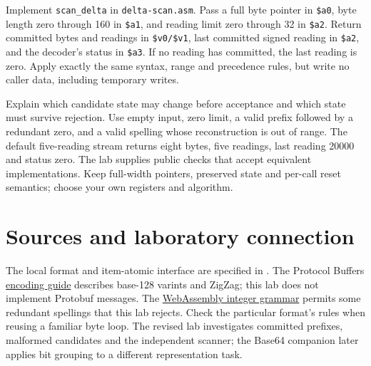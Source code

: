 Implement \texttt{scan\_delta} in \texttt{delta-scan.asm}. Pass a full byte
pointer in \texttt{\$a0}, byte length zero through 160 in \texttt{\$a1}, and
reading limit zero through 32 in \texttt{\$a2}. Return committed bytes and
readings in \texttt{\$v0/\$v1}, last committed signed reading in
\texttt{\$a2}, and the decoder's status in \texttt{\$a3}. If no reading has
committed, the last reading is zero. Apply exactly the same syntax, range and
precedence rules, but write no caller data, including temporary writes.

Explain which candidate state may change before acceptance and which state must
survive rejection. Use empty input, zero limit, a valid prefix followed by a
redundant zero, and a valid spelling whose reconstruction is out of range.
The default five-reading stream returns eight bytes, five readings, last reading
20000 and status zero. The lab supplies public checks that accept equivalent
implementations. Keep full-width pointers, preserved state and per-call reset
semantics; choose your own registers and algorithm.

\section*{Sources and laboratory connection}
The local format and item-atomic interface are specified in
. The Protocol Buffers
\href{https://protobuf.dev/programming-guides/encoding/}{encoding guide}
describes base-128 varints and ZigZag; this lab does not implement Protobuf
messages. The \href{https://webassembly.github.io/spec/core/binary/values.html#integers}{WebAssembly integer grammar}
permits some redundant spellings that this lab rejects. Check the particular
format's rules when reusing a familiar byte loop. The revised lab investigates
committed prefixes, malformed candidates and the independent scanner; the
Base64 companion later applies bit grouping to a different representation task.
